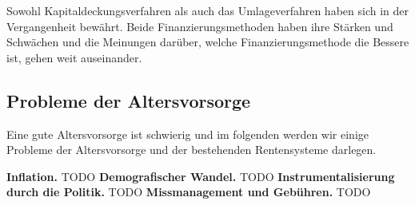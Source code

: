 Sowohl Kapitaldeckungsverfahren als auch das Umlageverfahren haben sich in der Vergangenheit bewährt. Beide Finanzierungsmethoden haben ihre Stärken und Schwächen und die Meinungen darüber, welche Finanzierungsmethode die Bessere ist, gehen weit auseinander.


\subsection{Probleme der Altersvorsorge}

Eine gute Altersvorsorge ist schwierig und im folgenden werden wir einige Probleme der Altersvorsorge und der bestehenden Rentensysteme darlegen.

\textbf{Inflation.}  TODO
\textbf{Demografischer Wandel.} TODO
\textbf{Instrumentalisierung durch die Politik.} TODO
\textbf{Missmanagement und Gebühren.} TODO

